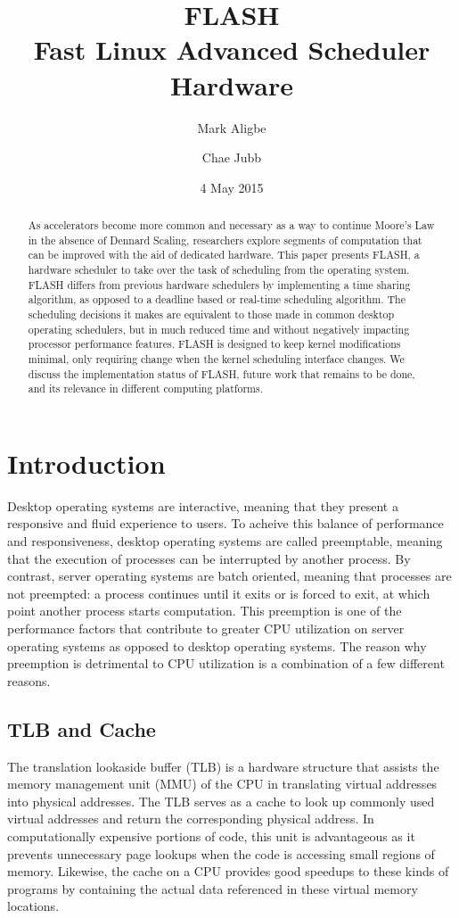 \documentclass{sig-alternate-10pt}
\title{FLASH\\Fast Linux Advanced Scheduler Hardware}
\author{
	Mark Aligbe \\
	    \email{ma2799@columbia.edu}
	\and
    Chae Jubb \\
        \email{ecj2122@columbia.edu}
}
\date{4 May 2015}
\begin{document}
\maketitle

\begin{abstract}
As accelerators become more common and necessary as a way to continue Moore's Law in the absence of Dennard Scaling, researchers explore segments of computation that can be improved with the aid of dedicated hardware. This paper presents FLASH, a hardware scheduler to take over the task of scheduling from the operating system. FLASH differs from previous hardware schedulers by implementing a time sharing algorithm, as opposed to a deadline based or real-time scheduling algorithm. The scheduling decisions it makes are equivalent to those made in common desktop operating schedulers, but in much reduced time and without negatively impacting processor performance features. FLASH is designed to keep kernel modifications minimal, only requiring change when the kernel scheduling interface changes. We discuss the implementation status of FLASH, future work that remains to be done, and its relevance in different computing platforms.

\end{abstract}


\section{Introduction}
\label{sec:intro}
Desktop operating systems are interactive, meaning that they present a responsive and fluid experience to users. To acheive this balance of performance and responsiveness, desktop operating systems are called preemptable, meaning that the execution of processes can be interrupted by another process. By contrast, server operating systems are batch oriented, meaning that processes are not preempted: a process continues until it exits or is forced to exit, at which point another process starts computation. This preemption is one of the performance factors that contribute to greater CPU utilization on server operating systems as opposed to desktop operating systems. The reason why preemption is detrimental to CPU utilization is a combination of a few different reasons.

\subsection{TLB and Cache}
The translation lookaside buffer (TLB) is a hardware structure that assists the memory management unit (MMU) of the CPU in translating virtual addresses into physical addresses. The TLB serves as a cache to look up commonly used virtual addresses and return the corresponding physical address. In computationally expensive portions of code, this unit is advantageous as it prevents unnecessary page lookups when the code is accessing small regions of memory. Likewise, the cache on a CPU provides good speedups to these kinds of programs by containing the actual data referenced in these virtual memory locations.
\end{document}
